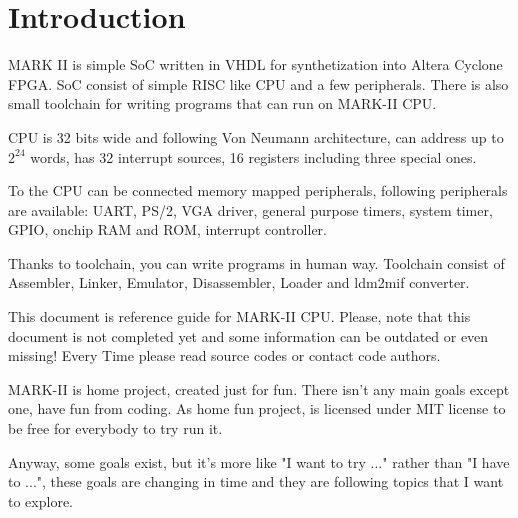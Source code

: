 \section{Introduction}

MARK II is simple SoC written in VHDL for synthetization into Altera Cyclone
FPGA. SoC consist of simple RISC like CPU and a few peripherals. There is also
small toolchain for writing programs that can run on MARK-II CPU.

CPU is 32 bits wide and following Von Neumann architecture, can address up to
$2^{24}$ words, has 32 interrupt sources, 16 registers including three special
ones.

To the CPU can be connected memory mapped peripherals, following peripherals
are available: UART, PS/2, VGA driver, general purpose timers, system timer,
GPIO, onchip RAM and ROM, interrupt controller.

Thanks to toolchain, you can write programs in human way. Toolchain consist of
Assembler, Linker, Emulator, Disassembler, Loader and ldm2mif converter.

This document is reference guide for MARK-II CPU. Please, note that this
document is not completed yet and some information can be outdated or even
missing! Every Time please read source codes or contact code authors.

MARK-II is home project, created just for fun. There isn't any main goals except
one, have fun from coding. As home fun project, is licensed under MIT license to
be free for everybody to try run it.

Anyway, some goals exist, but it's more like "I want to try ..." rather than
"I have to ...", these goals are changing in time and they are following topics
that I want to explore.
